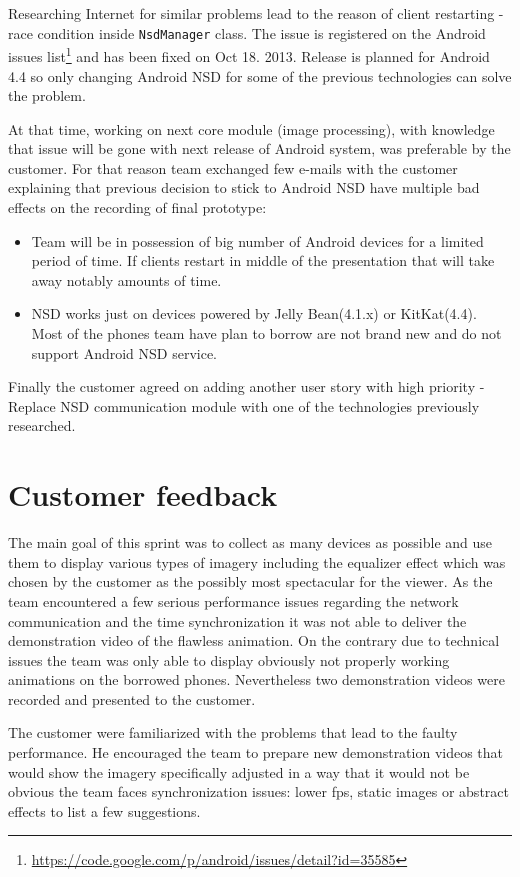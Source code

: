 Researching Internet for similar problems lead to the
reason of client restarting - race condition inside \texttt{NsdManager} class. The issue is registered on the Android issues list\footnote{\url{https://code.google.com/p/android/issues/detail?id=35585}} and has been fixed on Oct 18. 2013. Release is planned for Android 4.4 so only changing Android NSD for some of the previous technologies can solve the problem. 

At that time, working on next core module (image processing), with knowledge that issue will be gone with next release of Android system, was preferable by the customer. For that reason team exchanged few e-mails with the customer explaining that previous decision to stick to Android NSD have multiple bad effects on the recording of final prototype:
\begin{itemize}
\item Team will be in possession of big number of Android devices for a limited period of time. If clients restart in middle of the presentation that will take away notably amounts of time.

\item NSD works just on devices powered by Jelly Bean(4.1.x) or KitKat(4.4). Most of the phones team have plan to borrow are not brand new and do not support Android NSD service.
\end{itemize}

Finally the customer agreed on adding another user story with high priority - Replace NSD communication module with one of the technologies previously researched.

\section{Customer feedback} \label{txt:sprint5_customerfeedback}
The main goal of this sprint was to collect as many devices as possible and use them to display various types of imagery including the equalizer effect which was chosen by the customer as the possibly most spectacular for the viewer. As the team encountered a few serious performance issues regarding the network communication and the time synchronization it was not able to deliver the demonstration video of the flawless animation. On the contrary due to technical issues the team was only able to display obviously not properly working animations on the borrowed phones. Nevertheless two demonstration videos were recorded and presented to the customer.

The customer were familiarized with the problems that lead to the faulty performance. He encouraged the team to prepare new demonstration videos that would show the imagery specifically adjusted in a way that it would not be obvious the team faces synchronization issues: lower fps, static images or abstract effects to list a few suggestions.

